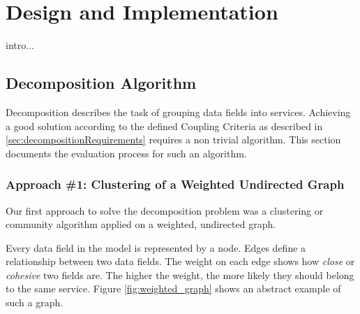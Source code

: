 
\chapter{Design and Implementation}
\label{cha:implementation}

intro...


\section{Decomposition Algorithm}

Decomposition describes the task of grouping data fields into services. Achieving a good solution according to the defined Coupling Criteria as described in \ref{sec:decompositionRequirements} requires a non trivial algorithm. This section documents the evaluation process for such an algorithm.

\subsection{Approach \#1: Clustering of a Weighted Undirected Graph}
\label{subsec:approach1_graph}

Our first approach to solve the decomposition problem was a clustering or community algorithm applied on a weighted, undirected graph.

Every data field in the model is represented by a node. Edges define a relationship between two data fields. The weight on each edge shows how \textit{close} or \textit{cohesive} two fields are. The higher the weight, the more likely they should belong to the same service. Figure \ref{fig:weighted_graph} shows an abstract example of such a graph.

